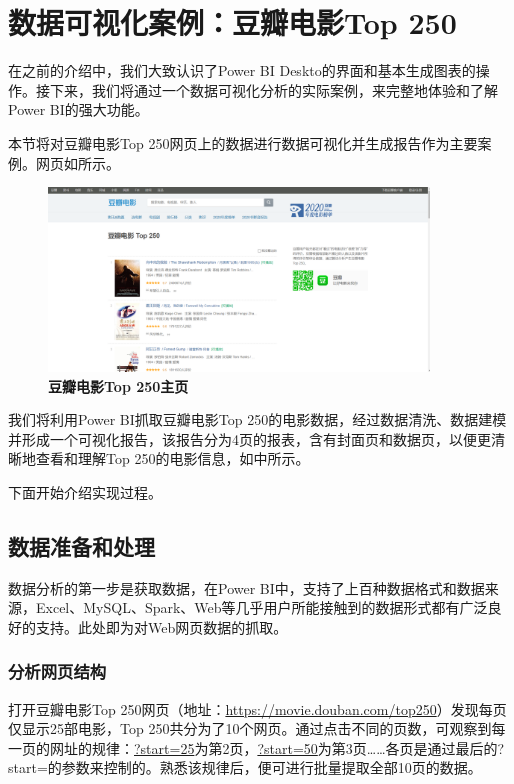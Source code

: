 \section{数据可视化案例：豆瓣电影Top 250}

在之前的介绍中，我们大致认识了Power BI Deskto的界面和基本生成图表的操作。接下来，我们将通过一个数据可视化分析的实际案例，来完整地体验和了解Power BI的强大功能。

本节将对豆瓣电影Top 250网页上的数据进行数据可视化并生成报告作为主要案例。网页如所示。

\begin{figure}[htbp]
    \centering
    \includegraphics[width=0.9\textwidth]{figure/PowerBI/douban_movie_main_page.png}
    \caption{\textbf{豆瓣电影Top 250主页}}
    \label{fig:douban_movie_main_page}
\end{figure}

我们将利用Power BI抓取豆瓣电影Top 250的电影数据，经过数据清洗、数据建模并形成一个可视化报告，该报告分为4页的报表，含有封面页和数据页，以便更清晰地查看和理解Top 250的电影信息，如中所示。


下面开始介绍实现过程。

\subsection{数据准备和处理}

数据分析的第一步是获取数据，在Power BI中，支持了上百种数据格式和数据来源，Excel、MySQL、Spark、Web等几乎用户所能接触到的数据形式都有广泛良好的支持。此处即为对Web网页数据的抓取。

\subsubsection{分析网页结构}

打开豆瓣电影Top 250网页（地址：\url{https://movie.douban.com/top250}）发现每页仅显示25部电影，Top 250共分为了10个网页。通过点击不同的页数，可观察到每一页的网址的规律：\url{?start=25}为第2页，\url{?start=50}为第3页……各页是通过最后的?start=的参数来控制的。熟悉该规律后，便可进行批量提取全部10页的数据。

